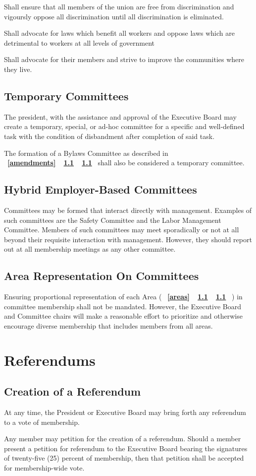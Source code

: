\documentclass[11pt]{article}
\newcommand{\article}[1]{\vspace{.75cm}\section{#1}}
\newcommand{\articlesection}[1]{\vspace{.25cm}\subsection{#1}}
\newcommand{\fullref}[3]{%
  \mbox{\textbf{%
    \ifthenelse{\isempty{#1}}%
    {}%
    {\ref{#1}}%
    \ifthenelse{\isempty{#2}}%
    {}%
    {%
      \ifthenelse{\isempty{#1}}{}{, }%
      \ref{#2}%
    }%
    \ifthenelse{\isempty{#3}}%
    {}%
    {\ref{#3}}%
  }}%
}
\begin{document}
\begin{description}[labelwidth=\linewidth, listparindent=0pt]
\item[Human Rights Committee]
Shall ensure that all members of the union are free from discrimination and vigoursly oppose all discrimination until all discrimination is eliminated.

\item[Legislative/Political Action Committee]
Shall advocate for laws which benefit all workers and oppose laws which are detrimental to workers at all levels of government

\item[Community Action Committee]
Shall advocate for their members and strive to improve the communities where they live.
\end{description}

\articlesection{Temporary Committees}
The president, with the assistance and approval of the Executive Board may create a temporary, special, or ad-hoc committee for a specific and well-defined task with the condition of disbandment after completion of said task.

The formation of a Bylaws Committee as described in \fullref{amendments}{}{} shall also be considered a temporary committee.

\articlesection{Hybrid Employer-Based Committees}
Committees may be formed that interact directly with management. Examples of such committees are the Safety Committee and the Labor Management Committee. Members of such committees may meet sporadically or not at all beyond their requisite interaction with management. However, they should report out at all membership meetings as any other committee.

\articlesection{Area Representation On Committees}
Ensuring proportional representation of each Area (\fullref{areas}{}{}) in committee membership shall not be mandated. However, the Executive Board and Committee chairs will make a reasonable effort to prioritize and otherwise encourage diverse membership that includes members from all areas.


\article{Referendums}\label{referendums}
\articlesection{Creation of a Referendum}
\begin{paralist}
  \item At any time, the President or Executive Board may bring forth any referendum to a vote of membership.

  \item Any member may petition for the creation of a referendum. Should a member present a petition for referendum to the Executive Board bearing the signatures of twenty-five (25) percent of membership, then that petition shall be accepted for membership-wide vote.
\end{paralist}
\end{document}
